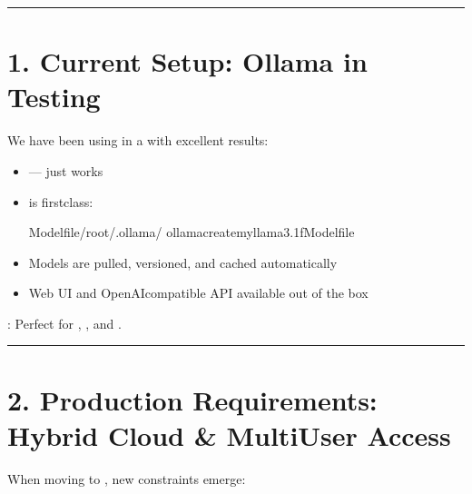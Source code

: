 \documentclass[letterpaper,10pt,english]{sphinxmanual}
\begin{document}
\bigskip\hrule\bigskip



\section{1. Current Setup: Ollama in Testing}
\label{\detokenize{hybrid:current-setup-ollama-in-testing}}
\sphinxAtStartPar
We have been using  in a  with excellent results:
\begin{itemize}
\item {} 
\sphinxAtStartPar
{} —  just works

\item {} 
\sphinxAtStartPar
{} is first\sphinxhyphen{}class:

\begin{sphinxVerbatim}[commandchars=\\\{\}]
Modelfile/root/.ollama/
ollamacreatemy\PYGZhy{}llama3.1\PYGZhy{}fModelfile
\end{sphinxVerbatim}

\item {} 
\sphinxAtStartPar
Models are pulled, versioned, and cached automatically

\item {} 
\sphinxAtStartPar
Web UI and OpenAI\sphinxhyphen{}compatible API available out of the box

\end{itemize}

\sphinxAtStartPar
{}: Perfect for , , and .


\bigskip\hrule\bigskip



\section{2. Production Requirements: Hybrid Cloud \& Multi\sphinxhyphen{}User Access}
\label{\detokenize{hybrid:production-requirements-hybrid-cloud-multi-user-access}}
\sphinxAtStartPar
When moving to , new constraints emerge:
\end{document}
